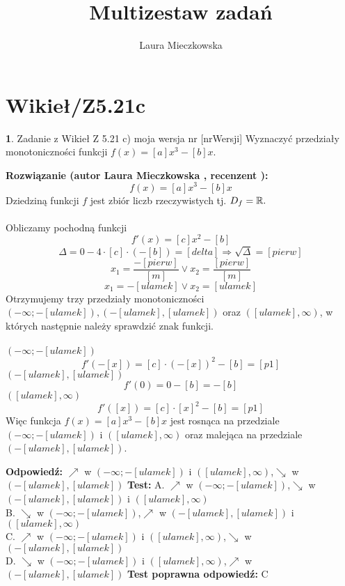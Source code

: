\documentclass[12pt, a4paper]{article}
\title{Multizestaw zadań}
\author{Laura Mieczkowska}
\date{}
\theoremstyle{definition} %
\newtheorem{zad}{}
\newcommand{\kategoria}[1]{\section{#1}} %
\newcommand{\zadStart}[1]{\begin{zad}#1\newline} %
\newcommand{\zadStop}{\end{zad}}   %
\newcommand{\rozwStart}[2]{\noindent \textbf{Rozwiązanie (autor #1 , recenzent #2): }\newline} %
\newcommand{\odpStart}{\noindent \textbf{Odpowiedź:}\newline}    %
\newcommand{\odpStop}{\newline}                                             %
\newcommand{\testStart}{\noindent \textbf{Test:}\newline} %
\newcommand{\testStop}{\newline} %
\newcommand{\kluczStart}{\noindent \textbf{Test poprawna odpowiedź:}\newline} %
\newcommand{\kluczStop}{\newline} %
\begin{document}
\maketitle


\kategoria{Wikieł/Z5.21c}
\zadStart{Zadanie z Wikieł Z 5.21 c) moja wersja nr [nrWersji]}
Wyznaczyć przedziały monotoniczności funkcji $f(x)=[a]x^3-[b]x$.
\zadStop
\rozwStart{Laura Mieczkowska}{}
$$f(x)=[a]x^3-[b]x$$
Dziedziną funkcji $f$ jest zbiór liczb rzeczywistych tj. $\mathnormal{D_f}=\mathbb{R}.$
\\\\Obliczamy pochodną funkcji
$$f'(x)=[c]x^2-[b]$$
$$\Delta=0-4\cdot[c]\cdot(-[b])=[delta]\Rightarrow \sqrt{\Delta}=[pierw]$$
$$x_1=\frac{-[pierw]}{[m]} \vee x_2=\frac{[pierw]}{[m]}$$
$$x_1=-[ulamek] \vee x_2=[ulamek]$$
Otrzymujemy trzy przedziały monotoniczności $(-\infty;-[ulamek]), (-[ulamek],[ulamek])$ oraz $([ulamek],\infty)$, w których następnie należy sprawdzić znak funkcji.
\\\\$(-\infty;-[ulamek])$
$$f'(-[x])=[c]\cdot(-[x])^2-[b]=[p1]$$
$(-[ulamek],[ulamek])$
$$f'(0)=0-[b]=-[b]$$
$([ulamek],\infty)$
$$f'([x])=[c]\cdot[x]^2-[b]=[p1]$$
Więc funkcja $f(x)=[a]x^3-[b]x$ jest rosnąca na przedziale $(-\infty;-[ulamek])$ i $([ulamek],\infty)$ oraz malejąca na przedziale $(-[ulamek],[ulamek])$.

\odpStart
$\nearrow$ w $(-\infty;-[ulamek])$ i $([ulamek],\infty)$,$\searrow$ w $(-[ulamek],[ulamek])$
\odpStop
\testStart
A. $\nearrow$ w $(-\infty;-[ulamek])$,$\searrow$ w $(-[ulamek],[ulamek])$ i $([ulamek],\infty)$\\
B. $\searrow$ w $(-\infty;-[ulamek])$,$\nearrow$ w $(-[ulamek],[ulamek])$ i $([ulamek],\infty)$ \\
C. $\nearrow$ w $(-\infty;-[ulamek])$ i $([ulamek],\infty)$,$\searrow$ w $(-[ulamek],[ulamek])$ \\
D. $\searrow$ w $(-\infty;-[ulamek])$ i $([ulamek],\infty)$,$\nearrow$ w $(-[ulamek],[ulamek])$ 
\testStop
\kluczStart
C
\kluczStop
\end{document}
